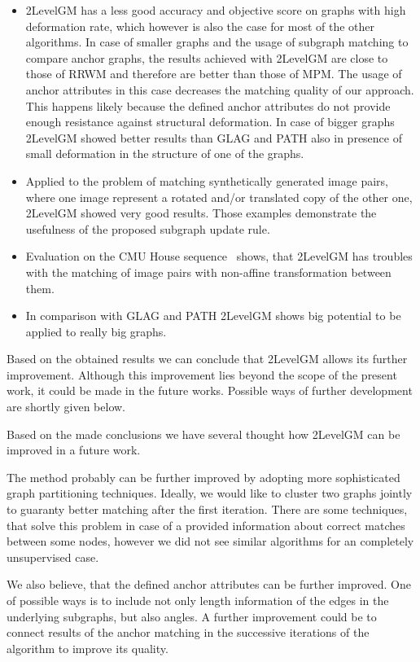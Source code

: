 \begin{itemize}
\item 2LevelGM has a less good accuracy and objective score on graphs with high deformation rate, which however is also the case for most of the other algorithms. In case of smaller graphs and the usage of subgraph matching to compare anchor graphs, the results achieved with 2LevelGM are close to those of RRWM and therefore are better than those of MPM. The usage of anchor attributes in this case decreases the matching quality of our approach.  This happens likely because the defined anchor attributes do not provide enough resistance against structural deformation. In case of bigger graphs 2LevelGM showed better results than GLAG and PATH also in presence of small deformation in the structure of one of the graphs.
\item Applied to the problem of matching synthetically generated image pairs, where one image represent a rotated and/or translated copy of the other one, 2LevelGM showed very good results.
Those examples demonstrate the usefulness of the proposed subgraph update rule.
\item Evaluation on the CMU House sequence~\cite{CMUHouse} shows, that 2LevelGM has troubles with the matching of image pairs with non-affine transformation between them.
\item In comparison with GLAG and PATH 2LevelGM shows big potential to be applied to really big graphs.
\end{itemize}

Based on the obtained results we can conclude that 2LevelGM allows its further improvement. Although this improvement lies beyond the scope of the present work, it could be made in the future works. Possible ways of further development are shortly given below.

Based on the made conclusions we have several thought how 2LevelGM can be improved in a future work. %

The method probably can be further improved by adopting more sophisticated graph partitioning techniques. Ideally, we would like to cluster two graphs jointly to guaranty better matching after the first iteration. There are some techniques, that solve this problem in case of a provided information about correct matches between some nodes, however we did not see similar algorithms for an completely unsupervised case.

We also believe, that the defined anchor attributes can be further improved. One of possible ways is to include not only length information of the edges in the underlying subgraphs, but also angles. A further improvement could be to connect results of the anchor matching in the successive iterations of the algorithm to improve its quality.

